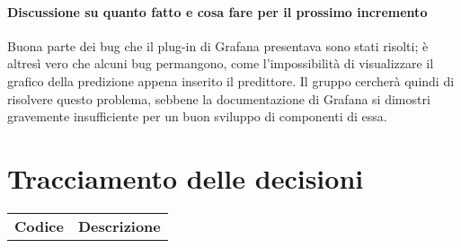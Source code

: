 \documentclass{article}
\begin{document}
\paragraph*{Discussione su quanto fatto e cosa fare per il prossimo incremento}
Buona parte dei bug che il plug-in di Grafana presentava sono stati risolti; è altresì vero che alcuni bug permangono, come l'impossibilità di visualizzare il grafico 
della predizione appena inserito il predittore. Il gruppo cercherà quindi di risolvere questo problema, sebbene la documentazione di Grafana si dimostri 
 gravemente insufficiente per un buon sviluppo di componenti di essa.

\section{Tracciamento delle decisioni}
\begin{table}[H]
  \centering
  \begin{tabular}{p{4cm}|p{12cm}}
    \rowcolor{lightgray}
    \textbf{Codice}  & \textbf{Descrizione}      \\
  \end{tabular}
\end{table}
\end{document}
